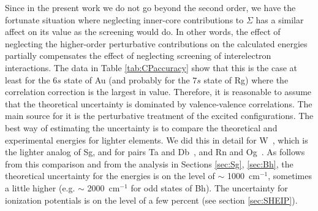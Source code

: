 \documentclass[8pt,a4paper, twoside]{report}
\begin{document}
Since in the present work we do not go beyond the second order, we have the fortunate situation where neglecting inner-core contributions to $\Sigma$ has a similar affect on its value as the screening would do. In other words, the effect of neglecting the higher-order perturbative contributions on
the calculated energies partially compensates the effect of neglecting
screening of interelectron interactions. The data in Table \ref{tab:CPaccuracy} show that this is the case at least for the
$6s$ state of Au (and probably for the $7s$ state of Rg) where the correlation correction
is the largest in value. Therefore, it is reasonable to assume that the theoretical uncertainty is dominated by valence-valence correlations. The main source for it is the perturbative treatment of the excited configurations. The best way of estimating the uncertainty is to compare the theoretical and experimental energies for lighter elements. We did this in detail for W~\cite{DBHF2017}, which is the lighter analog of Sg, and for pairs Ta and Db~\cite{LDFDb2018}, and Rn and Og~\cite{LDFOg2018}. As follows from this comparison and from the analysis in Sections \ref{sec:Sg}, \ref{sec:Bh}, the theoretical uncertainty for the energies is on the level of $\sim$ 1000~cm$^{-1}$, sometimes a little higher (e.g.  $\sim$ 2000~cm$^{-1}$ for odd states of Bh). The uncertainty for ionization potentials is on the level of a few percent (see section \ref{sec:SHEIP}).
\end{document}
